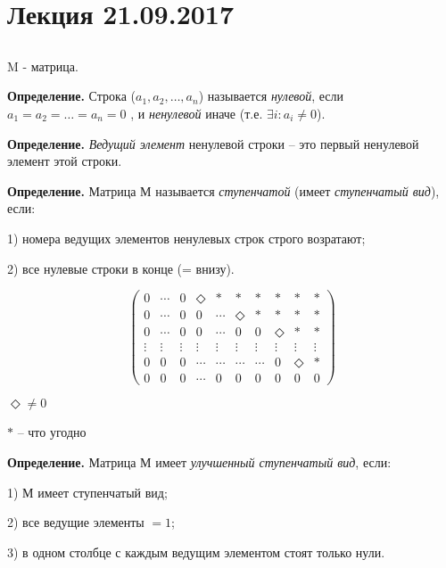 \section{Лекция 21.09.2017}

\subsection{}
M - матрица.

\vspace{\baselineskip}
\textbf{Определение.} Строка ($a_1, a_2, \dots , a_n$) называется \textit{нулевой}, если $a_1 = a_2 = \dots = a_n = 0$ , и \textit{ненулевой} иначе (т.е. $\exists i: a_i \neq 0$).

\vspace{\baselineskip}
\textbf{Определение.} \textit{Ведущий элемент} ненулевой строки -- это первый ненулевой элемент этой строки.

\vspace{\baselineskip}
\textbf{Определение.} Матрица М называется \textit{ступенчатой} (имеет \textit{ступенчатый вид}), если:

1) номера ведущих элементов ненулевых строк строго возратают;

2) все нулевые строки в конце (= внизу).

\[
    \begin{pmatrix}
    	0 & \cdots & 0 & \Diamond & * & * & * & * & * & * \\
        0 & \cdots & 0 & 0 & \cdots & \Diamond & * & * & * & * \\
        0 & \cdots & 0 & 0 & \cdots & 0 & 0 & \Diamond & * & * \\
        \vdots & \vdots & \vdots& \vdots & \vdots & \vdots & \vdots & \vdots & \vdots& \vdots \\
        0 & 0 & 0 & \cdots & \cdots & \cdots & \cdots & 0 & \Diamond & *\\
        0 & 0 & 0 & \cdots & 0 & 0 & 0 & 0 & 0 & 0
	\end{pmatrix}
\]

$\Diamond \neq 0$

$*$ -- что угодно

\vspace{\baselineskip}
\textbf{Определение.} Матрица М имеет \textit{улучшенный ступенчатый вид}, если:

1) М имеет ступенчатый вид;

2) все ведущие элементы $ = 1$;

3) в одном столбце с каждым ведущим элементом стоят только нули.

